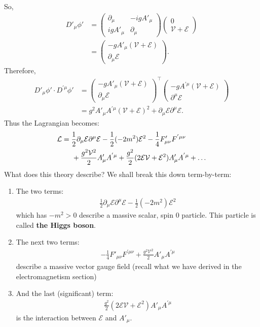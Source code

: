 \documentclass[a4paper,11pt]{article}
\numberwithin{equation}{section}
\theoremstyle{definition}
\newcommand{\p}{\partial}
\newcommand{\lag}{\mathcal{L}}
\newcommand{\E}{\mathcal{E}}
\begin{document}
So,
\begin{align}
D'_\mu \phi' &= \begin{pmatrix}
\p_\mu & -igA'_\mu\\
igA'_\mu &  \p_\mu
\end{pmatrix}\begin{pmatrix}
0 \\ \mathcal{V} + \mathcal{E} \end{pmatrix}\\ &= \begin{pmatrix}
-gA'_\mu (\mathcal{V} + \mathcal{E})\\
\p_\mu \mathcal{E}
\end{pmatrix}.
\end{align}
Therefore,
\begin{align}
D'_\mu \phi' \cdot D^{'\mu}\phi' &= \begin{pmatrix}
-gA'_\mu (\mathcal{V} + \mathcal{E})\\
\p_\mu \mathcal{E}
\end{pmatrix}^\top\begin{pmatrix}
-gA^{'\mu} (\mathcal{V} + \mathcal{E})\\
\p^\mu \mathcal{E}
\end{pmatrix}\\
 &= g^2 A'_\mu A^{'\mu}(\mathcal{V} + \mathcal{E})^2 + \p_\mu \mathcal{E} \p^\mu \mathcal{E}.
\end{align}
Thus the Lagrangian becomes:
\begin{align}
\lag &= \frac{1}{2}\p_\mu\E\p^\mu\E - \frac{1}{2}(-2m^2)\mathcal{E}^2 - \frac{1}{4}F'_{\mu\nu}F^{'\mu\nu}\\ 
&\hspace{0.5cm}+ \frac{g^2\mathcal{V}^2}{2}A'_\mu A^{'\mu} + \frac{g^2}{2}(2\mathcal{E}\mathcal{V} + \mathcal{E}^2)A'_\mu A^{'\mu} + \dots 
\end{align}
What does this theory describe? We shall break this down term-by-term:
\begin{enumerate}
	\item The two terms:
	\begin{align}
	\frac{1}{2}\p_\mu\E\p^\mu\E - \frac{1}{2}(-2m^2)\mathcal{E}^2
	\end{align}
	which has $-m^2 > 0$ describe a massive scalar, spin 0 particle. This particle is called \textbf{the Higgs boson}. \\
	
	\item The next two terms:
	\begin{align}
	- \frac{1}{4}F'_{\mu\nu}F^{'\mu\nu} + \frac{g^2\mathcal{V}^2}{2}A'_\mu A^{'\mu}
	\end{align}
	describe a massive vector gauge field (recall what we have derived in the electromagnetism section)\\
	
	\item And the last (significant) term:
	\begin{align}
	\frac{g^2}{2}(2\mathcal{E}\mathcal{V} + \mathcal{E}^2)A'_\mu A^{'\mu}
	\end{align}
	is the interaction between $\mathcal{E}$ and $A'_\mu$.
\end{enumerate}
\end{document}
